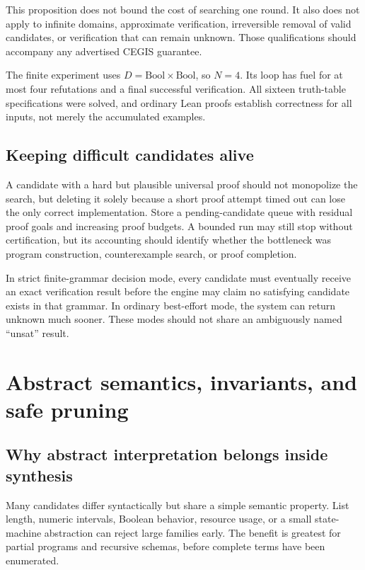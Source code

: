\documentclass[11pt,letterpaper]{article}
\theoremstyle{definition}
\theoremstyle{remark}
\begin{document}
This proposition does not bound the cost of searching one round. It also does not apply to infinite domains, approximate verification, irreversible removal of valid candidates, or verification that can remain unknown. Those qualifications should accompany any advertised CEGIS guarantee.

The finite experiment uses $D=\mathrm{Bool}\times\mathrm{Bool}$, so $N=4$. Its loop has fuel for at most four refutations and a final successful verification. All sixteen truth-table specifications were solved, and ordinary Lean proofs establish correctness for all inputs, not merely the accumulated examples.

\subsection{Keeping difficult candidates alive}

A candidate with a hard but plausible universal proof should not monopolize the search, but deleting it solely because a short proof attempt timed out can lose the only correct implementation. Store a pending-candidate queue with residual proof goals and increasing proof budgets. A bounded run may still stop without certification, but its accounting should identify whether the bottleneck was program construction, counterexample search, or proof completion.

In strict finite-grammar decision mode, every candidate must eventually receive an exact verification result before the engine may claim no satisfying candidate exists in that grammar. In ordinary best-effort mode, the system can return unknown much sooner. These modes should not share an ambiguously named ``unsat'' result.

\section{Abstract semantics, invariants, and safe pruning}
\label{sec:abstract}

\subsection{Why abstract interpretation belongs inside synthesis}

Many candidates differ syntactically but share a simple semantic property. List length, numeric intervals, Boolean behavior, resource usage, or a small state-machine abstraction can reject large families early. The benefit is greatest for partial programs and recursive schemas, before complete terms have been enumerated.
\end{document}
